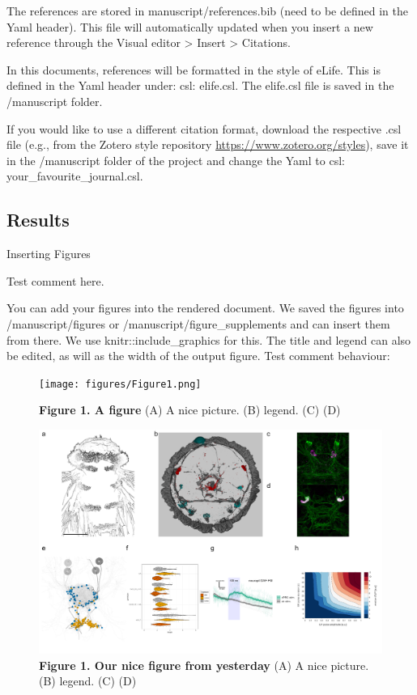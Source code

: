 \documentclass[
  11pt,
]{article}
\begin{document}
The references are stored in manuscript/references.bib (need to be
defined in the Yaml header). This file will automatically updated when
you insert a new reference through the Visual editor \textgreater{}
Insert \textgreater{} Citations.

In this documents, references will be formatted in the style of eLife.
This is defined in the Yaml header under: csl: elife.csl. The elife.csl
file is saved in the /manuscript folder.

If you would like to use a different citation format, download the
respective .csl file (e.g., from the Zotero style repository
\url{https://www.zotero.org/styles}), save it in the /manuscript folder
of the project and change the Yaml to csl: your\_favourite\_journal.csl.

\subsection{Results}\label{results}

Inserting Figures

Test comment here.

You can add your figures into the rendered document. We saved the
figures into /manuscript/figures or /manuscript/figure\_supplements and
can insert them from there. We use knitr::include\_graphics for this.
The title and legend can also be edited, as will as the width of the
output figure. Test comment behaviour:

\begin{figure}[H]

{\centering \texttt{[image: figures/Figure1.png]}

}

\caption{\textbf{Figure 1. A figure} (A) A nice picture. (B) legend. (C)
(D)}

\end{figure}%

\begin{figure}[H]

{\centering \includegraphics[width=1\textwidth,height=\textheight]{figures/Figure_complex.png}

}

\caption{\textbf{Figure 1. Our nice figure from yesterday} (A) A nice
picture. (B) legend. (C) (D)}

\end{figure}%
\end{document}
